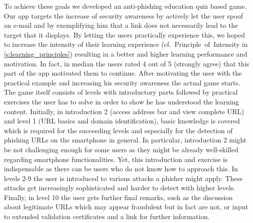 To achieve these goals we developed an anti-phishing education quiz based game.
Our app targets the increase of security awareness by actively let the user spoof an e-mail and by exemplifying him that a link does not necessarily lead to the target that it displays.
By letting the users practically experience this, we hoped to increase the intensity of their learning experience (cf.~Principle~of~Intensity in \autoref{s:learning_principles}) resulting in a better and higher learning performance and motivation. In fact, in median the users rated 4 out of 5 (strongly agree) that this part of the app motivated them to continue.
After motivating the user with the practical example and increasing his security awareness the actual game starts.
The game itself consists of levels with introductory parts followed by practical exercises the user has to solve in order to show he has understood the learning content.
Initially, in introduction 2 (access address bar and view complete URL) and level 1 (URL basics and domain identification), basic knowledge is covered which is required for the succeeding levels and especially for the detection of phishing URLs on the smartphone in general.
In particular, introduction 2 might be not challenging enough for some users as they might be already well-skilled regarding smartphone functionalities.
Yet, this introduction and exercise is indispensable as there can be users who do not know how to approach this.
In levels 2-9 the user is introduced to various attacks a phisher might apply.
These attacks get increasingly sophisticated and harder to detect with higher levels.
Finally, in level 10 the user gets further final remarks, such as the discussion about legitimate URLs which may appear fraudulent but in fact are not, or input to extended validation certificates and a link for further information.

